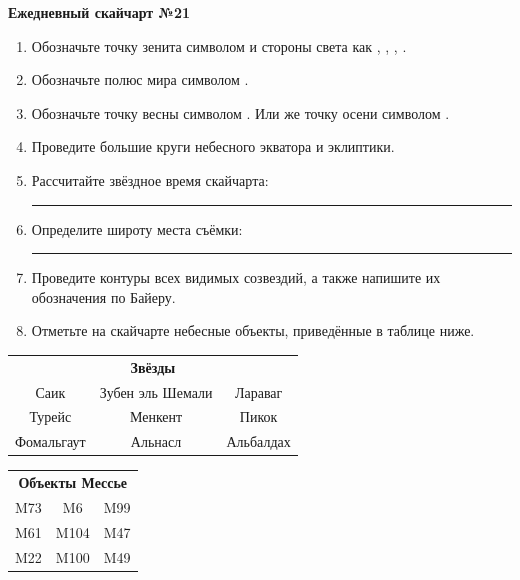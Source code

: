 \documentclass{./SAS-class-skygen}
\begin{document}
    
    
    
	\begin{center}
		\large\textbf{Ежедневный скайчарт №21}
	\end{center}

	\begin{enumerate}
		\item Обозначьте точку зенита символом  и стороны света как , , , .
		\item Обозначьте полюс мира символом .
		\item Обозначьте точку весны символом \Aries. Или же точку осени символом \Libra.
		\item Проведите большие круги небесного экватора и эклиптики.
		\item Рассчитайте звёздное время скайчарта: \rule{2cm}{0.4pt}
		\item Определите широту места съёмки: \rule{2cm}{0.4pt}
		\item Проведите контуры всех видимых созвездий, а также напишите их обозначения по Байеру.
		\item Отметьте на скайчарте небесные объекты, приведённые в таблице ниже.
	\end{enumerate}
	
    \vspace{0.5cm}

    \begin{table}[h!]
    \centering
    \begin{tabular}{ccc}
    \multicolumn{3}{c}{\textbf{Звёзды}} \\ Саик & Зубен эль Шемали & Лараваг \\
Турейс & Менкент & Пикок \\
Фомальгаут & Альнасл & Альбалдах \\

\end{tabular}
    \hfill
    \begin{tabular}{ccc}
    \multicolumn{3}{c}{\textbf{Объекты Мессье}} \\ M73 & M6 & M99 \\
M61 & M104 & M47 \\
M22 & M100 & M49 \\

\end{tabular}
    \end{table}
	
\end{document}
